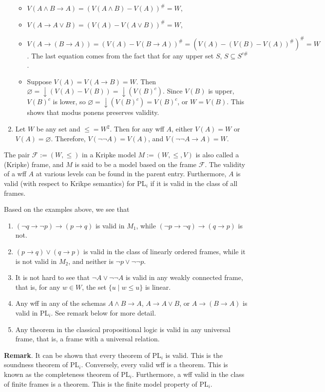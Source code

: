 \documentclass[12pt]{article}
\begin{document}
\begin{enumerate}
\begin{itemize}
\item $V(A\land B \to A) = (V(A\land B)-V(A))^{\#} = W$,
\item $V(A \to A\lor B) = (V(A) - V(A\lor B))^{\#} = W$,
\item $V(A\to (B\to A)) = (V(A)-V(B\to A))^{\#} = (V(A) - (V(B)-V(A))^{\#})^{\#}=W$.  The last equation comes from the fact that for any upper set $S$, $S\subseteq S^{c\#}$.
\item Suppose $V(A)=V(A\to B)=W$.  Then $\varnothing = \downarrow\!\! (V(A)-V(B))= \downarrow\!\! (V(B)^c)$.  Since $V(B)$ is upper, $V(B)^c$ is lower, so $\varnothing = \downarrow\!\! (V(B)^c) = V(B)^c$, or $W=V(B)$.  This shows that modus ponens preserves validity.
\end{itemize}
\item Let $W$ be any set and $\le = W^2$.  Then for any wff $A$, either $V(A)=W$ or $V(A)=\varnothing$.  Therefore, $V(\neg \neg A)=V(A)$, and $V(\neg \neg A\to A)=W$.
\end{enumerate}

The pair $\mathcal{F}:=(W,\le)$ in a Kripke model $M:=(W,\le,V)$ is also called a (Kripke) frame, and $M$ is said to be a model based on the frame $\mathcal{F}$.  The validity of a wff $A$ at various levels can be found in the parent entry.   Furthermore, $A$ is valid (with respect to Krikpe semantics) for PL$_i$ if it is valid in the class of all frames.

Based on the examples above, we see that 
\begin{enumerate}
\item
$(\neg q \to \neg p) \to (p\to q)$ is valid in $M_1$, while $(\neg p \to \neg q) \to (q\to p)$ is not.  
\item
$(p\to q)\lor (q\to p)$ is valid in the class of linearly ordered frames, while it is not valid in $M_2$, and neither is $\neg p \lor \neg \neg p$.  
\item 
It is not hard to see that $\neg A \lor \neg \neg A$ is valid in any weakly connected frame, that is, for any $w\in W$, the set $\lbrace u \mid w\le u\rbrace$ is linear.  
\item
Any wff in any of the schemas $A\land B\to A$, $A\to A\lor B$, or $A\to (B\to A)$ is valid in PL$_i$.  See remark below for more detail.
\item
Any theorem in the classical propositional logic is valid in any universal frame, that is, a frame with a universal relation.
\end{enumerate}

\textbf{Remark}.  It can be shown that every theorem of PL$_i$ is valid.  This is the soundness theorem of PL$_i$.  Conversely, every valid wff is a theorem.  This is known as the completeness theorem of PL$_i$.  Furthermore, a wff valid in the class of finite frames is a theorem.  This is the finite model property of PL$_i$.

\end{document}
